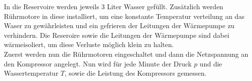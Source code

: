 In die Reservoire werden jeweils 3 Liter Wasser gefüllt. Zusätzlich werden
Rührmotore in diese installiert, um eine konstante Temperatur verteilung an 
das Waser zu gewährleisten und ein gefrieren der Leitungen der Wärmepumpe zu verhindern.
Die Reseroire sowie die Leitungen der Wärmepumpe sind dabei wärmeisoliert,
um diese Verluste möglich klein zu halten.\\

Zuerst werden nun die Rührmotoren eingeschaltet und dann die Netzspannung
an den Kompressor angelegt.
Nun wird für jede Minute der Druck $p$ und die Wassertemperatur $T$, sowie die 
Leistung des Kompressors gemessen.\\
